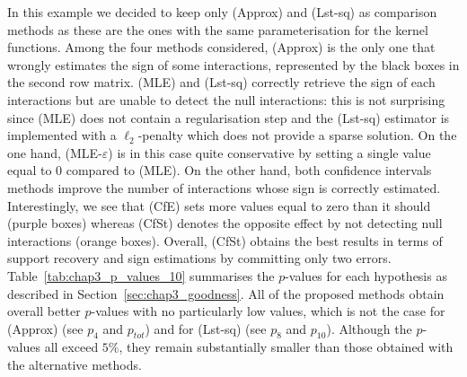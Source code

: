     In this example we decided to keep only (Approx) and (Lst-sq) as comparison methods as these are the ones with the same parameterisation for the kernel functions.
    Among the four methods considered, (Approx) is the only one that wrongly estimates the sign of some interactions, represented by the black boxes in the second row matrix. (MLE) and (Lst-sq) correctly retrieve the sign of each interactions but are unable to detect the null interactions: this is not surprising since (MLE) does not contain a regularisation step and the (Lst-sq) estimator is implemented with a $\ell_2$-penalty which does not provide a sparse solution.
    On the one hand, (MLE-$\varepsilon$) is in this case quite conservative by setting a single value equal to 0 compared to (MLE).
    On the other hand, both confidence intervals methods improve the number of interactions whose sign is correctly estimated. Interestingly, we see that (CfE) sets more values equal to zero than it should (purple boxes) whereas (CfSt) denotes the opposite effect by not detecting null interactions (orange boxes). Overall, (CfSt) obtains the best results in terms of support recovery and sign estimations by committing only two errors. Table~\ref{tab:chap3_p_values_10} summarises the $p$-values for each hypothesis as described in Section~\ref{sec:chap3_goodness}. 
    All of the proposed methods obtain overall better $p$-values with no particularly low values, which is not the case for (Approx) (see $p_4$ and $p_{tot}$) and for (Lst-sq) (see $p_8$ and $p_{10}$). Although the $p$-values all exceed $5\%$, they remain substantially smaller than those obtained with the alternative methods.  
    
